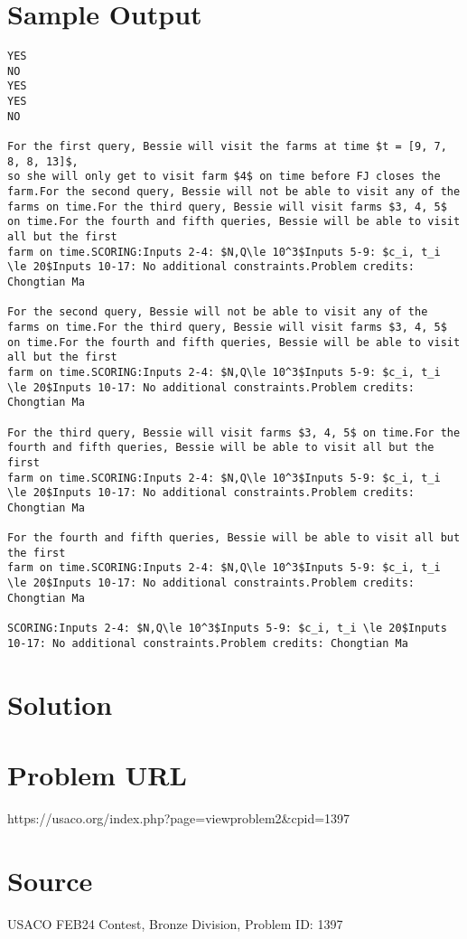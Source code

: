 \documentclass[12pt]{article}
\begin{document}
\section*{Sample Output}
\begin{verbatim}
YES
NO
YES
YES
NO

For the first query, Bessie will visit the farms at time $t = [9, 7, 8, 8, 13]$,
so she will only get to visit farm $4$ on time before FJ closes the farm.For the second query, Bessie will not be able to visit any of the farms on time.For the third query, Bessie will visit farms $3, 4, 5$ on time.For the fourth and fifth queries, Bessie will be able to visit all but the first
farm on time.SCORING:Inputs 2-4: $N,Q\le 10^3$Inputs 5-9: $c_i, t_i \le 20$Inputs 10-17: No additional constraints.Problem credits: Chongtian Ma

For the second query, Bessie will not be able to visit any of the farms on time.For the third query, Bessie will visit farms $3, 4, 5$ on time.For the fourth and fifth queries, Bessie will be able to visit all but the first
farm on time.SCORING:Inputs 2-4: $N,Q\le 10^3$Inputs 5-9: $c_i, t_i \le 20$Inputs 10-17: No additional constraints.Problem credits: Chongtian Ma

For the third query, Bessie will visit farms $3, 4, 5$ on time.For the fourth and fifth queries, Bessie will be able to visit all but the first
farm on time.SCORING:Inputs 2-4: $N,Q\le 10^3$Inputs 5-9: $c_i, t_i \le 20$Inputs 10-17: No additional constraints.Problem credits: Chongtian Ma

For the fourth and fifth queries, Bessie will be able to visit all but the first
farm on time.SCORING:Inputs 2-4: $N,Q\le 10^3$Inputs 5-9: $c_i, t_i \le 20$Inputs 10-17: No additional constraints.Problem credits: Chongtian Ma

SCORING:Inputs 2-4: $N,Q\le 10^3$Inputs 5-9: $c_i, t_i \le 20$Inputs 10-17: No additional constraints.Problem credits: Chongtian Ma
\end{verbatim}

\section*{Solution}


\section*{Problem URL}
https://usaco.org/index.php?page=viewproblem2&cpid=1397

\section*{Source}
USACO FEB24 Contest, Bronze Division, Problem ID: 1397
\end{document}
